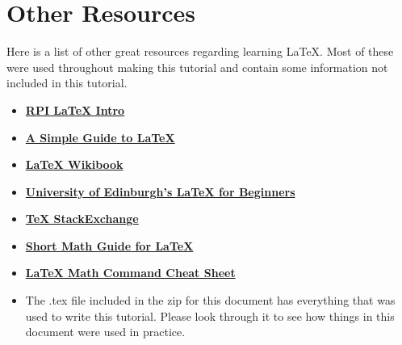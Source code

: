 \documentclass{article}
\begin{document}
	\section{Other Resources}
		Here is a list of other great resources regarding learning LaTeX. Most of these were used throughout making this tutorial and contain some information not included in this tutorial.
		\begin{itemize}
			\item \href{http://www.rpi.edu/dept/arc/docs/latex/latex-intro.pdf}{\textbf{RPI \LaTeX{} Intro}}
			\item \href{https://www.latex-tutorial.com/tutorials/}{\textbf{A Simple Guide to \LaTeX{}}}
			\item \href{https://en.wikibooks.org/wiki/LaTeX}{\textbf{\LaTeX{} Wikibook}}
			\item \href{http://www.docs.is.ed.ac.uk/skills/documents/3722/3722-2014.pdf}{\textbf{University of Edinburgh\rq{}s \LaTeX{} for Beginners}}
			\item \href{https://tex.stackexchange.com/}{\textbf{\TeX{} StackExchange}}
			\item \href{http://tug.ctan.org/info/short-math-guide/short-math-guide.pdf}{\textbf{Short Math Guide for \LaTeX{}}}
			\item \href{http://tug.ctan.org/info/undergradmath/undergradmath.pdf}{\textbf{\LaTeX{} Math Command Cheat Sheet}}
			\item The .tex file included in the zip for this document has everything that was used to write this tutorial. Please look through it to see how things in this document were used in practice.
		\end{itemize}
\end{document}
